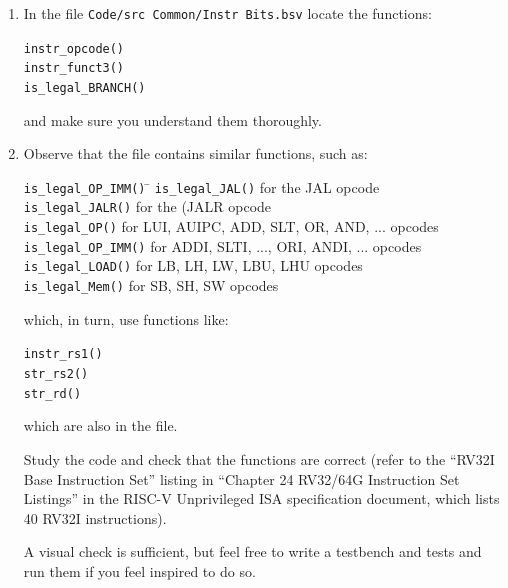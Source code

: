 \begin{enumerate}

  \item In the file \verb|Code/src Common/Instr Bits.bsv| locate the functions:

    \begin{tabbing}
      \hm \verb|instr_opcode()| \\
      \hm \verb|instr_funct3()| \\
      \hm \verb|is_legal_BRANCH()|
    \end{tabbing}

    and make sure you understand them thoroughly.

  \item  Observe that the file contains similar functions, such as:


    \begin{tabbing}
      \hm \= \verb|is_legal_OP_IMM()| \hm \= \kill
          \> \verb|is_legal_JAL()|        \> for the JAL opcode \\
          \> \verb|is_legal_JALR()|       \> for the (JALR opcode \\
          \> \verb|is_legal_OP()|         \> for LUI, AUIPC, ADD, SLT, OR, AND, ... opcodes \\
          \> \verb|is_legal_OP_IMM()|     \> for ADDI, SLTI, ..., ORI, ANDI, ... opcodes \\
          \> \verb|is_legal_LOAD()|       \> for LB, LH, LW, LBU, LHU opcodes \\
          \> \verb|is_legal_Mem()|        \> for SB, SH, SW opcodes
    \end{tabbing}

  which, in turn, use functions like:

    \begin{tabbing}
      \hm \verb|instr_rs1()| \\
        \hm \verb|str_rs2()| \\
        \hm \verb|str_rd()|
    \end{tabbing}

  which are also in the file.

  Study the code and check that the functions are correct (refer to
  the ``RV32I Base Instruction Set'' listing in ``Chapter 24 RV32/64G
  Instruction Set Listings'' in the RISC-V Unprivileged ISA
  specification document, which lists 40 RV32I instructions).

  A visual check is sufficient, but feel free to write a testbench and
  tests and run them if you feel inspired to do so.

\end{enumerate}


